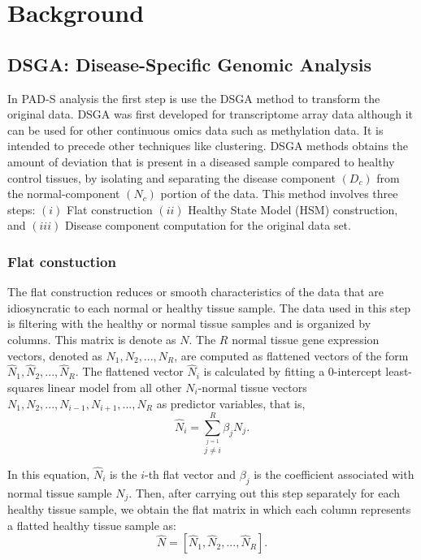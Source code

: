 \hypertarget{section2}{%
\section{Background}\label{section2}}

\hypertarget{section2.1}{%
\subsection{DSGA: Disease-Speciﬁc Genomic Analysis}\label{section2.1}}

In PAD-S analysis the first step is use the DSGA method to transform the original data.
DSGA was first developed for transcriptome array data although it can be used for other continuous omics data such as methylation data. It is intended to precede other techniques like clustering. DSGA methods obtains the amount of deviation that is present in a diseased sample compared to healthy control tissues, by isolating and separating the disease component \((D_{c})\) from the normal-component \((N_{c})\) portion of the data. This method involves three steps: \((i)\) Flat construction \((ii)\) Healthy State Model (HSM) construction, and \((iii)\) Disease component computation for the original data set.

\hypertarget{section2.1.1}{%
\subsubsection{Flat constuction}\label{section2.1.1}}

The flat construction reduces or smooth characteristics of the data that are idiosyncratic to each normal or healthy tissue sample. The data used in this step is filtering with the healthy or normal tissue samples and is organized by columns. This matrix is denote as \(N\). The \(R\) normal tissue gene expression vectors, denoted as \(N_{1},N_{2},...,N_{R}\), are computed as flattened vectors of the form \(\hat{N}_{1},\hat{N}_{2},...,\hat{N}_{R}\). The flattened vector \(\hat{N}_i\) is calculated by fitting a \(0\)-intercept least-squares linear model from all other \(N_i\)-normal tissue vectors \(N_{1},N_{2},...,N_{i-1},N_{i+1},...,N_{R}\) as predictor variables, that is,
\[\hat{N}_{i} = \sum_{\stackrel{j=1}{j\neq i}}^{R}\beta_{j}N_{j}.\]

In this equation, \(\hat{N}_{i}\) is the \(i\)-th flat vector and \(\beta_{j}\) is the coefficient associated with normal tissue sample \(N_{j}\). Then, after carrying out this step separately for each healthy tissue sample, we obtain the flat matrix in which each column represents a flatted healthy tissue sample as:
\[\hat{N} = \left[\hat{N}_{1},\hat{N}_{2},...,\hat{N}_{R}\right].\]

